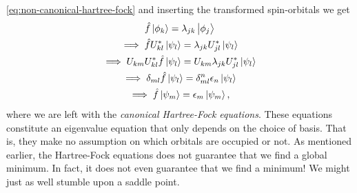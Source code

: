             \autoref{eq:non-canonical-hartree-fock} and inserting the transformed
            spin-orbitals we get
            \begin{gather}
                \hat{f}\ket{\phi_k} = \lambda_{jk}\ket{\phi_j}
                \\
                \implies
                \hat{f} U^{*}_{kl}\ket{\psi_{l}} = \lambda_{jk} U^{*}_{jl} \ket{\psi_l}
                \\
                \implies
                U_{km} U^{*}_{kl} \hat{f}\ket{\psi_l}
                = U_{km} \lambda_{jk} U^{*}_{jl} \ket{\psi_l}
                \\
                \implies
                \delta_{ml} \hat{f} \ket{\psi_l}
                = \delta^{n}_{ml} \epsilon_{n} \ket{\psi_l}
                \\
                \implies
                \hat{f}\ket{\psi_m}
                = \epsilon_{m} \ket{\psi_m},
                \label{eq:canonical-hartree-fock}
            \end{gather}
            where we are left with the \emph{canonical Hartree-Fock equations}.
            These equations constitute an eigenvalue equation that only depends on
            the choice of basis.
            That is, they make no assumption on which orbitals are occupied or not.
            As mentioned earlier, the Hartree-Fock equations does not guarantee that
            we find a global minimum.
            In fact, it does not even guarantee that we find a minimum!
            We might just as well stumble upon a saddle point.

